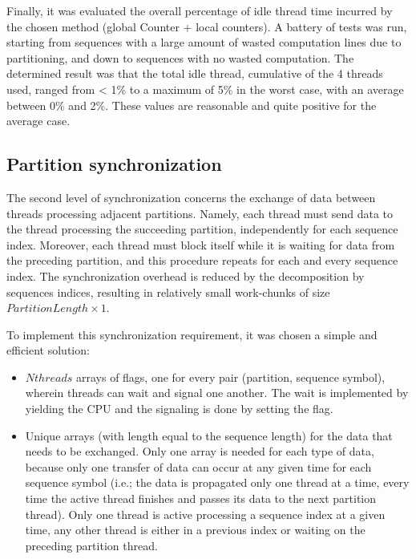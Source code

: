 Finally, it was evaluated the overall percentage of idle thread time incurred by the chosen method (global Counter + local counters). A battery of tests was run, starting from sequences with a large amount of wasted computation lines due to partitioning, and down to sequences with no wasted computation. The determined result was that the total idle thread, cumulative of the 4 threads used, ranged from < 1\% to a maximum of 5\% in the worst case, with an average between 0\% and 2\%. These values are reasonable and quite positive for the average case.


	
\subsection{Partition synchronization}

The second level of synchronization concerns the exchange of data between threads processing adjacent partitions. Namely, each thread must send data to the thread processing the succeeding partition, independently for each sequence index. Moreover, each thread must block itself while it is waiting for data from the preceding partition, and this procedure repeats for each and every sequence index. The synchronization overhead is reduced by the decomposition by sequences indices, resulting in relatively small work-chunks of size $PartitionLength \times 1$.

To implement this synchronization requirement, it was chosen a simple and efficient solution: 
\begin{itemize}
\item $Nthreads$ arrays of flags, one for every pair (partition, sequence symbol), wherein threads can wait and signal one another. The wait is implemented by yielding the CPU and the signaling is done by setting the flag.

\item Unique arrays (with length equal to the sequence length) for the data that needs to be exchanged.
Only one array is needed for each type of data, because only one transfer of data can occur at any given time for each sequence symbol (i.e.; the data is propagated only one thread at a time, every time the active thread finishes and passes its data to the next partition thread). Only one thread is active processing a sequence index at a given time, any other thread is either in a previous index or waiting on the preceding partition thread.
\end{itemize}

